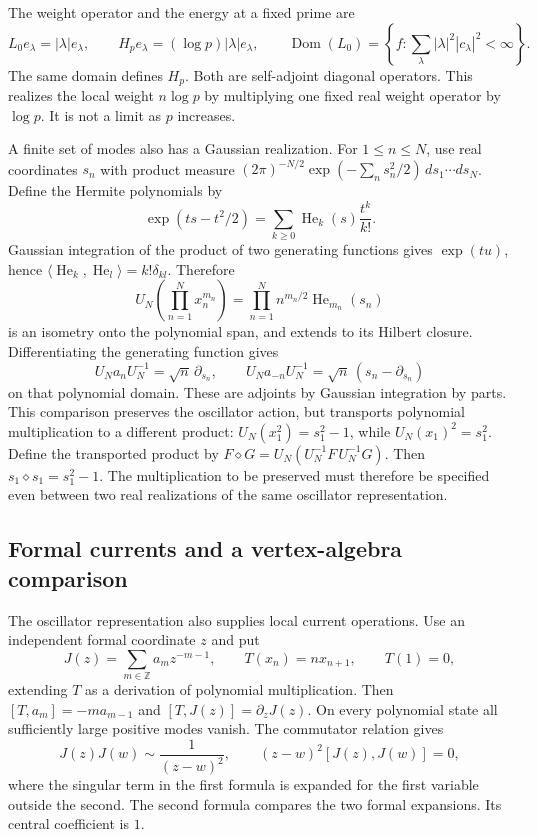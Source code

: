 The weight operator and the energy at a fixed prime are
\[
 L_0 e_\lambda=|\lambda|e_\lambda,\qquad
 H_pe_\lambda=(\log p)|\lambda|e_\lambda,
 \qquad
 \operatorname{Dom}(L_0)=
 \left\{f:\sum_\lambda |\lambda|^2|c_\lambda|^2<\infty\right\}.
\]
The same domain defines $H_p$. Both are self-adjoint diagonal operators.
This realizes the local weight $n\log p$ by multiplying one fixed real
weight operator by $\log p$. It is not a limit as $p$ increases.

A finite set of modes also has a Gaussian realization. For $1\le n\le N$,
use real coordinates $s_n$ with product measure
$(2\pi)^{-N/2}\exp(-\sum_ns_n^2/2)\,ds_1\cdots ds_N$.
Define the Hermite polynomials by
\[
 \exp(ts-t^2/2)=\sum_{k\ge0}\operatorname{He}_k(s)\frac{t^k}{k!}.
\]
Gaussian integration of the product of two generating functions gives
$\exp(tu)$, hence
$\langle\operatorname{He}_k,\operatorname{He}_l\rangle=k!\delta_{kl}$.
Therefore
\[
 U_N\!\left(\prod_{n=1}^N x_n^{m_n}\right)
 =\prod_{n=1}^N n^{m_n/2}\operatorname{He}_{m_n}(s_n)
\]
is an isometry onto the polynomial span, and extends to its Hilbert
closure. Differentiating the generating function gives
\[
 U_Na_nU_N^{-1}=\sqrt n\,\partial_{s_n},\qquad
 U_Na_{-n}U_N^{-1}=\sqrt n\,(s_n-\partial_{s_n})
\]
on that polynomial domain. These are adjoints by Gaussian integration
by parts. This comparison preserves the oscillator action, but transports
polynomial multiplication to a different product:
$U_N(x_1^2)=s_1^2-1$, while $U_N(x_1)^2=s_1^2$.
Define the transported product by
$F\diamond G=U_N(U_N^{-1}F\,U_N^{-1}G)$.
Then $s_1\diamond s_1=s_1^2-1$.
The multiplication to be preserved must therefore be specified even
between two real realizations of the same oscillator representation.

\subsection{Formal currents and a vertex-algebra comparison}

The oscillator representation also supplies local current operations.
Use an independent formal coordinate $z$ and put
\[
 J(z)=\sum_{m\in\mathbb Z}a_mz^{-m-1},\qquad
 T(x_n)=nx_{n+1},\qquad T(1)=0,
\]
extending $T$ as a derivation of polynomial multiplication.
Then $[T,a_m]=-ma_{m-1}$ and $[T,J(z)]=\partial_zJ(z)$.
On every polynomial state all sufficiently large positive modes vanish.
The commutator relation gives
\[
 J(z)J(w)\sim\frac{1}{(z-w)^2},\qquad
 (z-w)^2[J(z),J(w)]=0,
\]
where the singular term in the first formula is expanded for the first
variable outside the second. The second formula compares the two formal
expansions. Its central coefficient is $1$.


